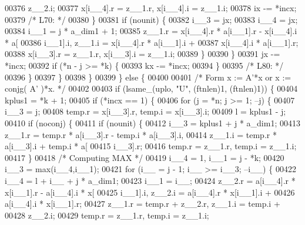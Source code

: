 \begin{DoxyCode}
00376                     z\_\_2.i;
00377                 x[i\_\_4].r = z\_\_1.r, x[i\_\_4].i = z\_\_1.i;
00378                 ix -= *incx;
00379 \textcolor{comment}{/* L70: */}
00380             \}
00381             \textcolor{keywordflow}{if} (nounit) \{
00382                 i\_\_3 = jx;
00383                 i\_\_4 = jx;
00384                 i\_\_1 = j * a\_dim1 + 1;
00385                 z\_\_1.r = x[i\_\_4].r * a[i\_\_1].r - x[i\_\_4].i * a[
00386                     i\_\_1].i, z\_\_1.i = x[i\_\_4].r * a[i\_\_1].i + 
00387                     x[i\_\_4].i * a[i\_\_1].r;
00388                 x[i\_\_3].r = z\_\_1.r, x[i\_\_3].i = z\_\_1.i;
00389             \}
00390             \}
00391             jx -= *incx;
00392             \textcolor{keywordflow}{if} (*n - j >= *k) \{
00393             kx -= *incx;
00394             \}
00395 \textcolor{comment}{/* L80: */}
00396         \}
00397         \}
00398     \}
00399     \} \textcolor{keywordflow}{else} \{
00400 
00401 \textcolor{comment}{/*        Form  x := A'*x  or  x := conjg( A' )*x. */}
00402 
00403     \textcolor{keywordflow}{if} (lsame\_(uplo, \textcolor{stringliteral}{"U"}, (ftnlen)1, (ftnlen)1)) \{
00404         kplus1 = *k + 1;
00405         \textcolor{keywordflow}{if} (*incx == 1) \{
00406         \textcolor{keywordflow}{for} (j = *n; j >= 1; --j) \{
00407             i\_\_3 = j;
00408             temp.r = x[i\_\_3].r, temp.i = x[i\_\_3].i;
00409             l = kplus1 - j;
00410             \textcolor{keywordflow}{if} (noconj) \{
00411             \textcolor{keywordflow}{if} (nounit) \{
00412                 i\_\_3 = kplus1 + j * a\_dim1;
00413                 z\_\_1.r = temp.r * a[i\_\_3].r - temp.i * a[i\_\_3].i, 
00414                     z\_\_1.i = temp.r * a[i\_\_3].i + temp.i * a[
00415                     i\_\_3].r;
00416                 temp.r = z\_\_1.r, temp.i = z\_\_1.i;
00417             \}
00418 \textcolor{comment}{/* Computing MAX */}
00419             i\_\_4 = 1, i\_\_1 = j - *k;
00420             i\_\_3 = max(i\_\_4,i\_\_1);
00421             \textcolor{keywordflow}{for} (i\_\_ = j - 1; i\_\_ >= i\_\_3; --i\_\_) \{
00422                 i\_\_4 = l + i\_\_ + j * a\_dim1;
00423                 i\_\_1 = i\_\_;
00424                 z\_\_2.r = a[i\_\_4].r * x[i\_\_1].r - a[i\_\_4].i * x[
00425                     i\_\_1].i, z\_\_2.i = a[i\_\_4].r * x[i\_\_1].i + 
00426                     a[i\_\_4].i * x[i\_\_1].r;
00427                 z\_\_1.r = temp.r + z\_\_2.r, z\_\_1.i = temp.i + 
00428                     z\_\_2.i;
00429                 temp.r = z\_\_1.r, temp.i = z\_\_1.i;

\end{DoxyCode}
